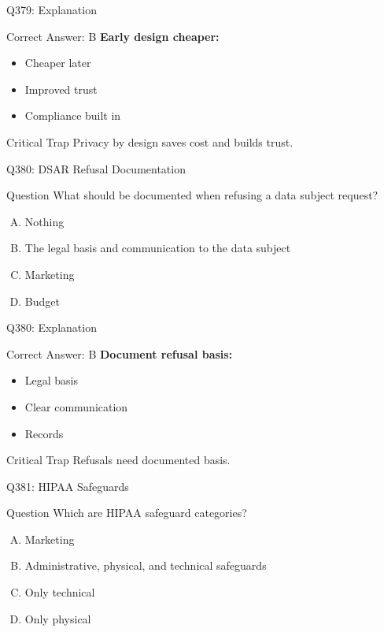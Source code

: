 \documentclass{beamer}
\begin{document}
	\begin{frame}{Q379: Explanation}
		\begin{block}{Correct Answer: B}
			\textbf{Early design cheaper:}
			\begin{itemize}
				\item Cheaper later
				\item Improved trust
				\item Compliance built in
			\end{itemize}
		\end{block}
		\begin{alertblock}{Critical Trap}
			Privacy by design saves cost and builds trust.
		\end{alertblock}
	\end{frame}
	
	\begin{frame}{Q380: DSAR Refusal Documentation}
		\begin{block}{Question}
			What should be documented when refusing a data subject request?
		\end{block}
		\begin{enumerate}[(A)]
			\item Nothing
			\item The legal basis and communication to the data subject
			\item Marketing
			\item Budget
		\end{enumerate}
	\end{frame}
	
	\begin{frame}{Q380: Explanation}
		\begin{block}{Correct Answer: B}
			\textbf{Document refusal basis:}
			\begin{itemize}
				\item Legal basis
				\item Clear communication
				\item Records
			\end{itemize}
		\end{block}
		\begin{alertblock}{Critical Trap}
			Refusals need documented basis.
		\end{alertblock}
	\end{frame}
	
	\begin{frame}{Q381: HIPAA Safeguards}
		\begin{block}{Question}
			Which are HIPAA safeguard categories?
		\end{block}
		\begin{enumerate}[(A)]
			\item Marketing
			\item Administrative, physical, and technical safeguards
			\item Only technical
			\item Only physical
		\end{enumerate}
	\end{frame}
	
\end{document}
